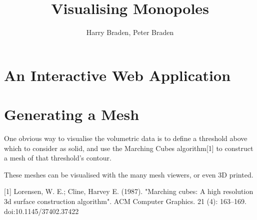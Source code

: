 \documentclass{article}
\title{Visualising Monopoles}
\author{Harry Braden, Peter Braden}
\begin{document}
\maketitle

\begin{abstract}

\end{abstract}


\section{An Interactive Web Application}

\section{Generating a Mesh}
One obvious way to visualise the volumetric data is to define a threshold above
which to consider as solid, and use the Marching Cubes algorithm[1] to construct
a mesh of that threshold's contour.

These meshes can be visualised with the many mesh viewers, or even 3D printed.




[1] Lorensen, W. E.; Cline, Harvey E. (1987). "Marching cubes: A high resolution 3d surface construction algorithm". ACM Computer Graphics. 21 (4): 163–169. doi:10.1145/37402.37422
\end{document}
